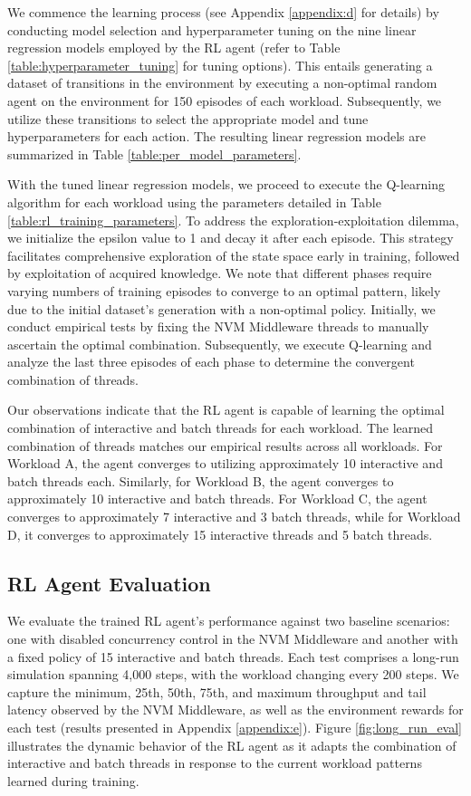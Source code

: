 We commence the learning process (see Appendix \ref{appendix:d} for details) by conducting model selection and hyperparameter tuning on the nine linear regression models employed by the RL agent (refer to Table \ref{table:hyperparameter_tuning} for tuning options). This entails generating a dataset of transitions in the environment by executing a non-optimal random agent on the environment for 150 episodes of each workload. Subsequently, we utilize these transitions to select the appropriate model and tune hyperparameters for each action. The resulting linear regression models are summarized in Table \ref{table:per_model_parameters}.

With the tuned linear regression models, we proceed to execute the Q-learning algorithm for each workload using the parameters detailed in Table \ref{table:rl_training_parameters}. To address the exploration-exploitation dilemma, we initialize the epsilon value to 1 and decay it after each episode. This strategy facilitates comprehensive exploration of the state space early in training, followed by exploitation of acquired knowledge. We note that different phases require varying numbers of training episodes to converge to an optimal pattern, likely due to the initial dataset's generation with a non-optimal policy. Initially, we conduct empirical tests by fixing the NVM Middleware threads to manually ascertain the optimal combination. Subsequently, we execute Q-learning and analyze the last three episodes of each phase to determine the convergent combination of threads.

Our observations indicate that the RL agent is capable of learning the optimal combination of interactive and batch threads for each workload. The learned combination of threads matches our empirical results across all workloads. For Workload A, the agent converges to utilizing approximately 10 interactive and batch threads each. Similarly, for Workload B, the agent converges to approximately 10 interactive and batch threads. For Workload C, the agent converges to approximately 7 interactive and 3 batch threads, while for Workload D, it converges to approximately 15 interactive threads and 5 batch threads.

\subsection*{RL Agent Evaluation}

We evaluate the trained RL agent's performance against two baseline scenarios: one with disabled concurrency control in the NVM Middleware and another with a fixed policy of 15 interactive and batch threads. Each test comprises a long-run simulation spanning 4,000 steps, with the workload changing every 200 steps. We capture the minimum, 25th, 50th, 75th, and maximum throughput and tail latency observed by the NVM Middleware, as well as the environment rewards for each test (results presented in Appendix \ref{appendix:e}). Figure \ref{fig:long_run_eval} illustrates the dynamic behavior of the RL agent as it adapts the combination of interactive and batch threads in response to the current workload patterns learned during training.

